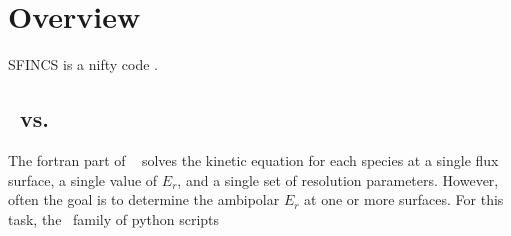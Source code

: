 \chapter{Overview}


SFINCS is a nifty code \cite{sfincsPaper}.


\section{\sfincs~vs. \sfincsScan}
The fortran part of \sfincs~ solves the kinetic equation for each species
at a single flux surface, a single value of $E_r$, and a single set of resolution parameters.
However, often the goal is to determine the ambipolar $E_r$ at one or more surfaces.
For this task, the \sfincsScan~family of python scripts



\begin{figure}[htbp]
\begin{center}
\end{center}
\end{figure}





